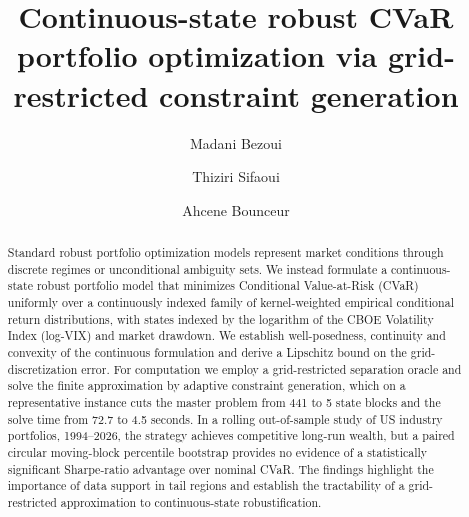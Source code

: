 \documentclass[smallextended]{svjour3}
\begin{document}
\sloppy

\title{Continuous-state robust CVaR portfolio optimization via grid-restricted constraint generation}

\author{Madani Bezoui \and Thiziri Sifaoui \and Ahcene Bounceur}


\date{}

\maketitle

\begin{abstract}
Standard robust portfolio optimization models represent market conditions through discrete regimes or unconditional ambiguity sets. We instead formulate a continuous-state robust portfolio model that minimizes Conditional Value-at-Risk (CVaR) uniformly over a continuously indexed family of kernel-weighted empirical conditional return distributions, with states indexed by the logarithm of the CBOE Volatility Index (log-VIX) and market drawdown. We establish well-posedness, continuity and convexity of the continuous formulation and derive a Lipschitz bound on the grid-discretization error. For computation we employ a grid-restricted separation oracle and solve the finite approximation by adaptive constraint generation, which on a representative instance cuts the master problem from 441 to 5 state blocks and the solve time from 72.7 to 4.5 seconds. In a rolling out-of-sample study of US industry portfolios, 1994--2026, the strategy achieves competitive long-run wealth, but a paired circular moving-block percentile bootstrap provides no evidence of a statistically significant Sharpe-ratio advantage over nominal CVaR. The findings highlight the importance of data support in tail regions and establish the tractability of a grid-restricted approximation to continuous-state robustification.
\end{abstract}
\end{document}
